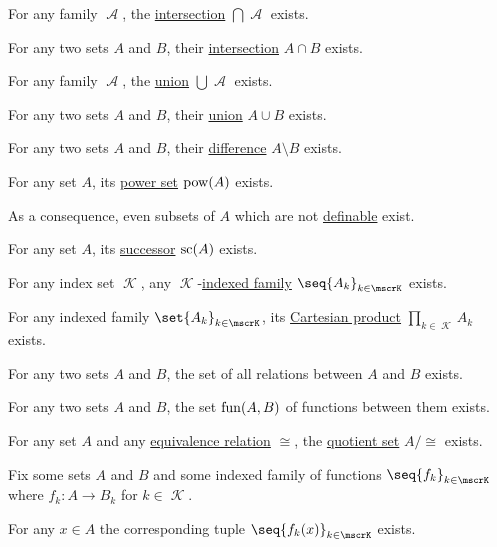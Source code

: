\begin{proposition}
\begin{thmenum}
     For any  family \( \mscrA \), the \hyperref[def:basic_set_operations/intersection]{intersection} \( \bigcap \mscrA \) exists.

     For any two sets \( A \) and \( B \), their \hyperref[def:basic_set_operations/intersection]{intersection} \( A \cap B \) exists.

     For any family \( \mscrA \), the \hyperref[def:basic_set_operations/union]{union} \( \bigcup \mscrA \) exists.

     For any two sets \( A \) and \( B \), their \hyperref[def:basic_set_operations/union]{union} \( A \cup B \) exists.

     For any two sets \( A \) and \( B \), their \hyperref[def:basic_set_operations/difference]{difference} \( A \setminus B \) exists.

     For any set \( A \), its \hyperref[def:basic_set_operations/power_set]{power set} \( \operatorname{pow}(A) \) exists.

    As a consequence, even subsets of \( A \) which are not \hyperref[def:first_order_definability]{definable} exist.

     For any set \( A \), its \hyperref[def:ordinal_successor]{successor} \( \op{sc}(A) \) exists.

     For any index set \( \mscrK \), any \( \mscrK \)-\hyperref[def:indexed_family]{indexed family} \( \seq{ A_k }_{k \in \mscrK} \) exists.

     For any indexed family \( \set{ A_k }_{k \in \mscrK} \), its \hyperref[def:cartesian_product]{Cartesian product} \( \prod_{k \in \mscrK} A_k \) exists.

     For any two sets \( A \) and \( B \), the set of all relations between \( A \) and \( B \) exists.

     For any two sets \( A \) and \( B \), the set \hyperref[def:function/set_of_functions]{\( \operatorname{fun}(A, B) \)} of functions between them exists.

     For any set \( A \) and any \hyperref[def:equivalence_relation]{equivalence relation} \( \cong \), the \hyperref[def:equivalence_relation/quotient]{quotient set} \( A / {\cong} \) exists.

     Fix some sets \( A \) and \( B \) and some indexed family of functions \( \seq{ f_k }_{k \in \mscrK} \) where \( f_k: A \to B_k \) for \( k \in \mscrK \).

    For any \( x \in A \) the corresponding tuple \( \seq{ f_k(x) }_{k \in \mscrK} \) exists.
  \end{thmenum}
\end{proposition}

